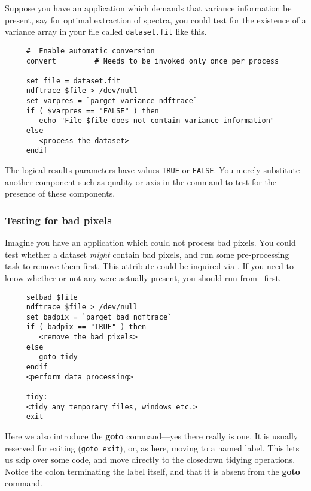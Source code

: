 Suppose you have an application which demands that variance information
be present, say for optimal extraction of spectra, you could test for
the existence of a variance array in your  file called {\tt dataset.fit} like this.

\small
\begin{verbatim}
     #  Enable automatic conversion
     convert         # Needs to be invoked only once per process
     
     set file = dataset.fit
     ndftrace $file > /dev/null
     set varpres = `parget variance ndftrace`
     if ( $varpres == "FALSE" ) then
        echo "File $file does not contain variance information"
     else
        <process the dataset>
     endif
\end{verbatim}
\normalsize
The logical results parameters have values {\tt TRUE} or {\tt FALSE}\@.
You merely substitute another component such as quality or axis in the
 command to test for the presence of
these components.

\subsubsection{Testing for bad pixels
\label{sc4_se_dataset_badpix}}

Imagine you have an application which could not process bad pixels.
You could test whether a dataset {\em might\/} contain bad pixels, and
run some pre-processing task to remove them first.  This attribute
could be inquired via .  If you
need to know whether or not any were actually present, you should run
 from \KAPPAref\ first.

\small
\begin{verbatim}
     setbad $file
     ndftrace $file > /dev/null
     set badpix = `parget bad ndftrace`
     if ( badpix == "TRUE" ) then
        <remove the bad pixels>
     else
        goto tidy
     endif
     <perform data processing>
     
     tidy:
     <tidy any temporary files, windows etc.>
     exit
\end{verbatim}
\normalsize
Here we also introduce the {\bf goto} command---yes there really is
one.  It is usually reserved for exiting ({\tt goto exit}), or, as here,
moving to a named label.  This lets us skip over some code, and move
directly to the closedown tidying operations.  Notice the colon
terminating the label itself, and that it is absent from the {\bf goto}
command.

